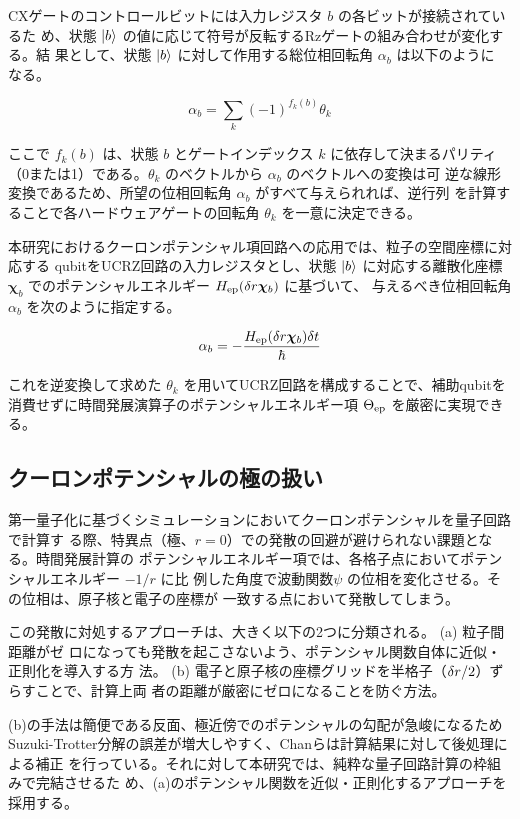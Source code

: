 \documentclass[wabun2025.tex]{subfiles}
\begin{document}
CXゲートのコントロールビットには入力レジスタ $b$ の各ビットが接続されているた
め、状態 $\ket{b}$ の値に応じて符号が反転するRzゲートの組み合わせが変化する。結
果として、状態 $\ket{b}$ に対して作用する総位相回転角 $\alpha_b$ は以下のように
なる。

\begin{equation}
    \alpha_b = \sum_{k}{(-1)^{f_k(b)}\theta_k}
\end{equation}

ここで $f_k(b)$ は、状態 $b$ とゲートインデックス $k$ に依存して決まるパリティ
（0または1）である。$\theta_k$ のベクトルから $\alpha_b$ のベクトルへの変換は可
逆な線形変換であるため、所望の位相回転角 $\alpha_b$ がすべて与えられれば、逆行列
を計算することで各ハードウェアゲートの回転角 $\theta_k$ を一意に決定できる。

本研究におけるクーロンポテンシャル項回路への応用では、粒子の空間座標に対応する
qubitをUCRZ回路の入力レジスタとし、状態 $\ket{b}$ に対応する離散化座標
$\bm{\chi}_b$ でのポテンシャルエネルギー $H_{\mathrm{ep}}(\delta r\bm{\chi}_b)$ に基づいて、
与えるべき位相回転角 $\alpha_b$ を次のように指定する。

\begin{equation}
\alpha_b = -\frac{H_{\mathrm{ep}}(\delta r\bm{\chi}_b)\delta t}{\hbar}
\end{equation}

これを逆変換して求めた $\theta_k$ を用いてUCRZ回路を構成することで、補助qubitを
消費せずに時間発展演算子のポテンシャルエネルギー項 $\Theta_{\mathrm{ep}}$ を厳密に実現でき
る。

\subsection{クーロンポテンシャルの極の扱い}
\label{sec:coulomb-potential-handling}
第一量子化に基づくシミュレーションにおいてクーロンポテンシャルを量子回路で計算す
る際、特異点（極、$r=0$）での発散の回避が避けられない課題となる。時間発展計算の
ポテンシャルエネルギー項では、各格子点においてポテンシャルエネルギー $-1/r$ に比
例した角度で波動関数$\psi$ の位相を変化させる。その位相は、原子核と電子の座標が
一致する点において発散してしまう。

この発散に対処するアプローチは、大きく以下の2つに分類される。 (a) 粒子間距離がゼ
ロになっても発散を起こさないよう、ポテンシャル関数自体に近似・正則化を導入する方
法。 (b) 電子と原子核の座標グリッドを半格子（$\delta r/2$）ずらすことで、計算上両
者の距離が厳密にゼロになることを防ぐ方法\cite{Chan2023.sciadv.abo7484}。

(b)の手法は簡便である反面、極近傍でのポテンシャルの勾配が急峻になるため
Suzuki-Trotter分解の誤差が増大しやすく、Chanらは計算結果に対して後処理による補正
を行っている。それに対して本研究では、純粋な量子回路計算の枠組みで完結させるた
め、(a)のポテンシャル関数を近似・正則化するアプローチを採用する。
\end{document}
